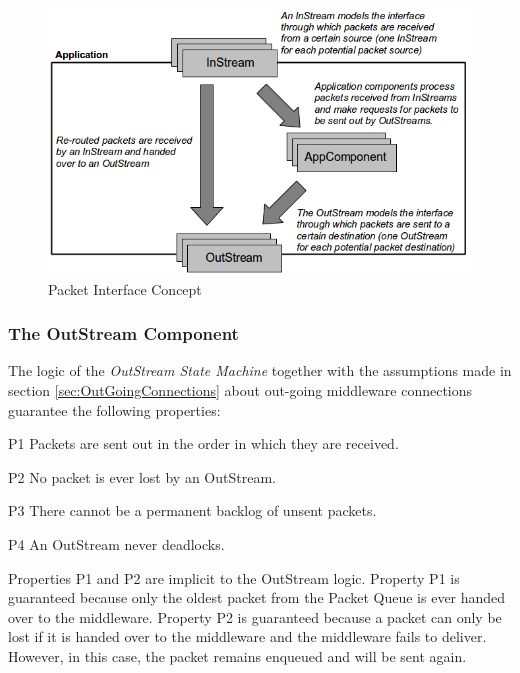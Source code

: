 \documentclass[a4paper,10pt]{article}
\newenvironment{fw_itemize}						%
{\begin{itemize}
  \setlength{\itemsep}{1mm}
  \setlength{\parskip}{0pt}
  \setlength{\parsep}{0pt}}
{\end{itemize}}
\begin{document}
\begin{figure}[ht]
 \centering
 \includegraphics[scale=0.40,keepaspectratio=true]{PcktInterfaceConcept.png}
 \caption{Packet Interface Concept}
 \label{fig:PcktInterfaceConcept}
\end{figure}

\subsubsection{The OutStream Component}\label{sec:OutStream}


The logic of the \textit{OutStream State Machine} together with the assumptions made in section \ref{sec:OutGoingConnections} about out-going middleware connections guarantee the following properties:

\begin{fw_itemize}
\item[P1]{Packets are sent out in the order in which they are received.}
\item[P2]{No packet is ever lost by an OutStream.}
\item[P3]{There cannot be a permanent backlog of unsent packets.}
\item[P4]{An OutStream never deadlocks.}
\end{fw_itemize}

Properties P1 and P2 are implicit to the OutStream logic. Property P1 is guaranteed because only the oldest packet from the Packet Queue is ever handed over to the middleware. Property P2 is guaranteed because a packet can only be lost if it is handed over to the middleware and the middleware fails to deliver. However, in this case, the packet remains enqueued and will be sent again.
\end{document}
